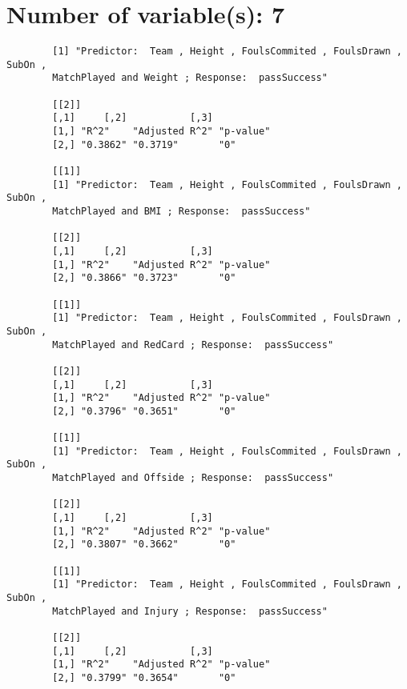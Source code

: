 \documentclass[12pt]{article}
\begin{document}
	\section{Number of variable(s): 7}
	\begin{verbatim}
		[1] "Predictor:  Team , Height , FoulsCommited , FoulsDrawn , SubOn , 
		MatchPlayed and Weight ; Response:  passSuccess"
		
		[[2]]
		[,1]     [,2]           [,3]     
		[1,] "R^2"    "Adjusted R^2" "p-value"
		[2,] "0.3862" "0.3719"       "0"      
		
		[[1]]
		[1] "Predictor:  Team , Height , FoulsCommited , FoulsDrawn , SubOn , 
		MatchPlayed and BMI ; Response:  passSuccess"
		
		[[2]]
		[,1]     [,2]           [,3]     
		[1,] "R^2"    "Adjusted R^2" "p-value"
		[2,] "0.3866" "0.3723"       "0"      
		
		[[1]]
		[1] "Predictor:  Team , Height , FoulsCommited , FoulsDrawn , SubOn , 
		MatchPlayed and RedCard ; Response:  passSuccess"
		
		[[2]]
		[,1]     [,2]           [,3]     
		[1,] "R^2"    "Adjusted R^2" "p-value"
		[2,] "0.3796" "0.3651"       "0"      
		
		[[1]]
		[1] "Predictor:  Team , Height , FoulsCommited , FoulsDrawn , SubOn , 
		MatchPlayed and Offside ; Response:  passSuccess"
		
		[[2]]
		[,1]     [,2]           [,3]     
		[1,] "R^2"    "Adjusted R^2" "p-value"
		[2,] "0.3807" "0.3662"       "0"      
		
		[[1]]
		[1] "Predictor:  Team , Height , FoulsCommited , FoulsDrawn , SubOn , 
		MatchPlayed and Injury ; Response:  passSuccess"
		
		[[2]]
		[,1]     [,2]           [,3]     
		[1,] "R^2"    "Adjusted R^2" "p-value"
		[2,] "0.3799" "0.3654"       "0"  
		
	\end{verbatim}
	
	
	
\end{document}
